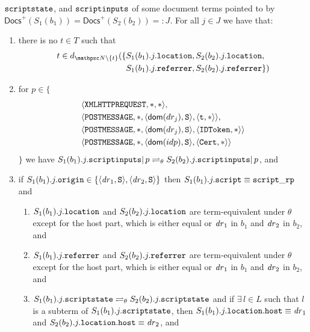 \begin{definition}
\begin{enumerate}
\begin{enumerate}
        $\mathtt{scriptstate}$, and $\mathtt{scriptinputs}$ of some document terms
        pointed to by $\mathsf{Docs}^+(S_1(b_1)) = \mathsf{Docs}^+(S_2(b_2)) =: J$. 
        For all $j \in J$ we have that: \label{eqs:b:w}
        \begin{enumerate}
        \item there is no $t \in T$ such that
          \begin{align*}
            t \in d_{\nonces \setminus \{t\}}(\{&S_1(b_1).j.\str{location}
            ,  S_2(b_2).j.\str{location},\\ & S_1(b_1).j.\str{referrer} , 
            S_2(b_2).j.\str{referrer}\})
          \end{align*}
        \item for $p \in \{$
          \begin{align*}
            & \langle\mathtt{XMLHTTPREQUEST},*,*\rangle,\\
            & \langle\mathtt{POSTMESSAGE},*,\langle\mathsf{dom}(dr_j), \mathtt{S}\rangle,\langle\mathtt{t}, *\rangle\rangle,\\
            & \langle\mathtt{POSTMESSAGE},*,\langle\mathsf{dom}(dr_j), \mathtt{S}\rangle,\langle\mathtt{IDToken}, *\rangle\rangle\\
            & \langle\mathtt{POSTMESSAGE},*,\langle\mathsf{dom}(idp), \mathtt{S}\rangle,\langle\mathtt{Cert}, *\rangle\rangle
          \end{align*}
          $\}$ we have
          $S_1(b_1).j.\mathtt{scriptinputs} |\, p \rightleftharpoons_{\theta}
          S_2(b_2).j.\mathtt{scriptinputs} |\, p$, and
        \item\label{eqs:b:w:script_rp} if
          $S_1(b_1).j.\mathtt{origin} \in \{\langle\mathit{dr}_1, \mathtt{S}\rangle,\langle\mathit{dr}_2, \mathtt{S}\rangle\}$
          then $S_1(b_1).j.\mathtt{script} \equiv \mathtt{script\_rp}$ and \
          \begin{enumerate}
          \item $S_1(b_1).j.\mathtt{location}$ and $S_2(b_2).j.\mathtt{location}$
            are term-equivalent under $\theta$ except for the host part,
            which is either equal or $\mathit{dr}_1$ in $b_1$ and $\mathit{dr}_2$ in
            $b_2$, and
          \item $S_1(b_1).j.\mathtt{referrer}$ and $S_2(b_2).j.\mathtt{referrer}$
            are term-equivalent under $\theta$ except for the host part,
            which is either equal or $\mathit{dr}_1$ in $b_1$ and $\mathit{dr}_2$ in
            $b_2$, and
          \item
            $S_1(b_1).j.\mathtt{scriptstate} \rightleftharpoons_{\theta}
            S_2(b_2).j.\mathtt{scriptstate}$ and if $\exists\, l \in L$ such that $l$ is a subterm of $S_1(b_1).j.\mathtt{scriptstate}$, then $S_1(b_1).j.\mathtt{location}.\mathtt{host} \equiv \mathit{dr}_1$ and $S_2(b_2).j.\mathtt{location}.\mathtt{host} \equiv \mathit{dr}_2$, and

\end{enumerate}
\end{enumerate}
\end{enumerate}
\end{enumerate}
\end{definition}
